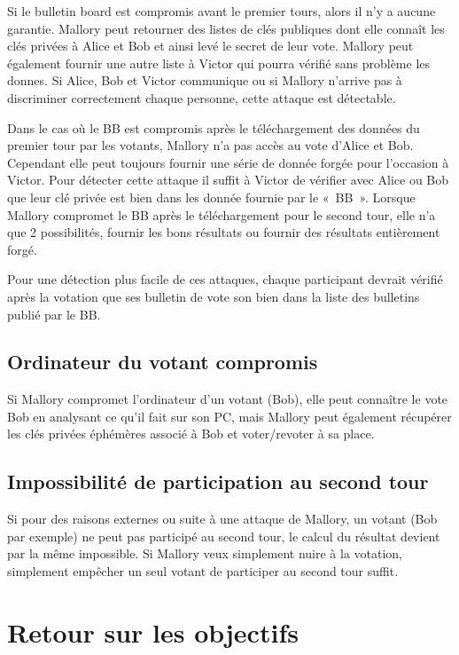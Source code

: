 \documentclass[../report]{subfiles}
\begin{document}
Si le bulletin board est compromis avant le premier tours, alors il n'y a aucune garantie.
Mallory peut retourner des listes de clés publiques dont elle connaît les clés privées à Alice et Bob et ainsi levé 
le secret de leur vote. Mallory peut également fournir une autre liste à Victor qui pourra vérifié sans problème les donnes.
Si Alice, Bob et Victor communique ou si Mallory n'arrive pas à discriminer correctement chaque personne, cette attaque est 
détectable.

Dans le cas où le BB est compromis après le téléchargement des données du premier tour par les votants, Mallory n'a pas accès au vote
d'Alice et Bob.
Cependant elle peut toujours fournir une série de donnée forgée pour l'occasion à Victor. 
Pour détecter cette attaque il suffit à Victor de vérifier avec Alice ou Bob que leur clé privée est bien dans les donnée fournie par le «~BB~». 
Lorsque Mallory compromet le BB après le téléchargement pour le second tour, elle n'a que 2 possibilités, fournir les bons résultats 
ou fournir des résultats entièrement forgé.

Pour une détection plus facile de ces attaques, chaque participant devrait vérifié après la votation que ses bulletin de vote son bien dans la liste
des bulletins publié par le BB.

\section{Ordinateur du votant compromis}

Si Mallory compromet l'ordinateur d'un votant (Bob), elle peut connaître le vote Bob en analysant ce qu'il fait sur son PC, 
mais Mallory peut également récupérer les clés privées éphémères associé à Bob et voter/revoter à sa place.

\section{Impossibilité de participation au second tour}

Si pour des raisons externes ou suite à une attaque de Mallory, un votant (Bob par exemple) ne peut pas participé au second tour, le 
calcul du résultat devient par la même impossible. Si Mallory veux simplement nuire à la votation, simplement empêcher un seul votant 
de participer au second tour suffit.

\chapter{Retour sur les objectifs}
\end{document}
